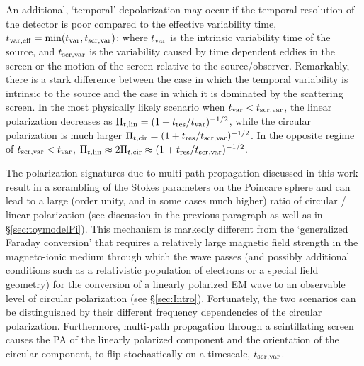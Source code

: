\documentclass[fleqn,usenatbib]{mnras}
\begin{document}
	An additional, `temporal' depolarization may occur if the temporal resolution of the detector is poor compared to the effective variability time, $t_{\rm var,eff}=\min(t_{\rm var},t_{\rm scr,var})$; where $t_{\rm var}$ is the intrinsic variability time of the source, and $t_{\rm scr,var}$ is the variability caused by time dependent eddies in the screen or the motion of the screen relative to the source/observer. Remarkably, there is a stark difference between the case in which the temporal variability is intrinsic to the source and the case in which it is dominated by the scattering screen. In the most physically likely scenario when $t_{\rm var}< t_{\rm scr,var}$, the linear polarization decreases as $\Pi_{t\rm,lin}=(1+ t_{\rm res}/t_{\rm var})^{-1/2}$, while the circular polarization is much larger $\Pi_{t\rm,cir}=(1+ t_{\rm res}/t_{\rm scr,var})^{-1/2}$. In the opposite regime of $t_{\rm scr,var}<t_{\rm var}$, $\Pi_{t\rm,lin}\approx 2\Pi_{t\rm,cir}\approx (1+ t_{\rm res}/t_{\rm scr,var})^{-1/2}$.
	
	The polarization signatures due to multi-path propagation discussed in this work result in a scrambling of the Stokes parameters on the Poincare sphere and can lead to a large (order unity, and in some cases much higher) ratio of circular / linear polarization (see discussion in the previous paragraph as well as in \S \ref{sec:toymodelPi}). This mechanism is markedly different from the `generalized Faraday conversion' that requires a relatively large magnetic field strength in the magneto-ionic medium through which the wave passes (and possibly additional conditions such as a relativistic population of electrons or a special field geometry) for the conversion of a linearly polarized EM wave to an observable level of circular polarization (see \S \ref{sec:Intro}). Fortunately, the two scenarios can be distinguished by their different frequency dependencies of the circular polarization.  Furthermore,  multi-path propagation through a scintillating screen causes the PA of the linearly polarized component and the orientation of the circular component, to flip stochastically on a timescale, $t_{\rm scr,var}$.
	
\end{document}
